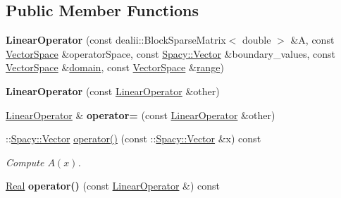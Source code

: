 \subsection*{\-Public \-Member \-Functions}
\begin{DoxyCompactItemize}
\item 
\hypertarget{classSpacy_1_1dealII_1_1LinearOperator_a102b08e79b612da071c6de502cd15fc1}{{\bfseries \-Linear\-Operator} (const dealii\-::\-Block\-Sparse\-Matrix$<$ double $>$ \&\-A, const \hyperlink{classSpacy_1_1VectorSpace}{\-Vector\-Space} \&operator\-Space, const \hyperlink{classSpacy_1_1Vector}{\-Spacy\-::\-Vector} \&boundary\-\_\-values, const \hyperlink{classSpacy_1_1VectorSpace}{\-Vector\-Space} \&\hyperlink{classSpacy_1_1OperatorBase_a2588f9b3e0188820c4c494e63293dc6f}{domain}, const \hyperlink{classSpacy_1_1VectorSpace}{\-Vector\-Space} \&\hyperlink{classSpacy_1_1OperatorBase_ab19d3b7a6f290b1079248f1e567e53d6}{range})}\label{classSpacy_1_1dealII_1_1LinearOperator_a102b08e79b612da071c6de502cd15fc1}

\item 
\hypertarget{classSpacy_1_1dealII_1_1LinearOperator_a18a77229674a6d7be21aee1e199734a7}{{\bfseries \-Linear\-Operator} (const \hyperlink{classSpacy_1_1dealII_1_1LinearOperator}{\-Linear\-Operator} \&other)}\label{classSpacy_1_1dealII_1_1LinearOperator_a18a77229674a6d7be21aee1e199734a7}

\item 
\hypertarget{classSpacy_1_1dealII_1_1LinearOperator_ae0ce5b35ba269b997f64dd483750aff9}{\hyperlink{classSpacy_1_1dealII_1_1LinearOperator}{\-Linear\-Operator} \& {\bfseries operator=} (const \hyperlink{classSpacy_1_1dealII_1_1LinearOperator}{\-Linear\-Operator} \&other)}\label{classSpacy_1_1dealII_1_1LinearOperator_ae0ce5b35ba269b997f64dd483750aff9}

\item 
\-::\hyperlink{classSpacy_1_1Vector}{\-Spacy\-::\-Vector} \hyperlink{classSpacy_1_1dealII_1_1LinearOperator_a5874d400fdc11be1a2f8f45d3d4969fa}{operator()} (const \-::\hyperlink{classSpacy_1_1Vector}{\-Spacy\-::\-Vector} \&x) const 
\begin{DoxyCompactList}\small\item\em \-Compute $A(x)$. \end{DoxyCompactList}\item 
\hypertarget{classSpacy_1_1dealII_1_1LinearOperator_a9adc85435d04c2da0e35e41690c41c08}{\hyperlink{classSpacy_1_1Real}{\-Real} {\bfseries operator()} (const \hyperlink{classSpacy_1_1dealII_1_1LinearOperator}{\-Linear\-Operator} \&) const }\label{classSpacy_1_1dealII_1_1LinearOperator_a9adc85435d04c2da0e35e41690c41c08}


\end{DoxyCompactItemize}
